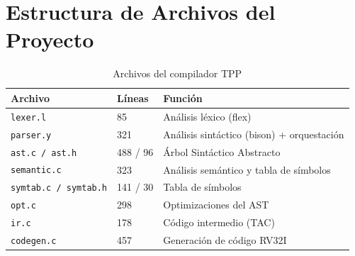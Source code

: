 \section{Estructura de Archivos del Proyecto}

\begin{table}[H]
\centering
\begin{tabular}{lll}
\toprule
\textbf{Archivo} & \textbf{Líneas} & \textbf{Función} \\
\midrule
\texttt{lexer.l} & 85 & Análisis léxico (flex) \\
\texttt{parser.y} & 321 & Análisis sintáctico (bison) + orquestación \\
\texttt{ast.c / ast.h} & 488 / 96 & Árbol Sintáctico Abstracto \\
\texttt{semantic.c} & 323 & Análisis semántico y tabla de símbolos \\
\texttt{symtab.c / symtab.h} & 141 / 30 & Tabla de símbolos \\
\texttt{opt.c} & 298 & Optimizaciones del AST \\
\texttt{ir.c} & 178 & Código intermedio (TAC) \\
\texttt{codegen.c} & 457 & Generación de código RV32I \\
\bottomrule
\end{tabular}
\caption{Archivos del compilador TPP}
\label{tab:archivos}
\end{table}
